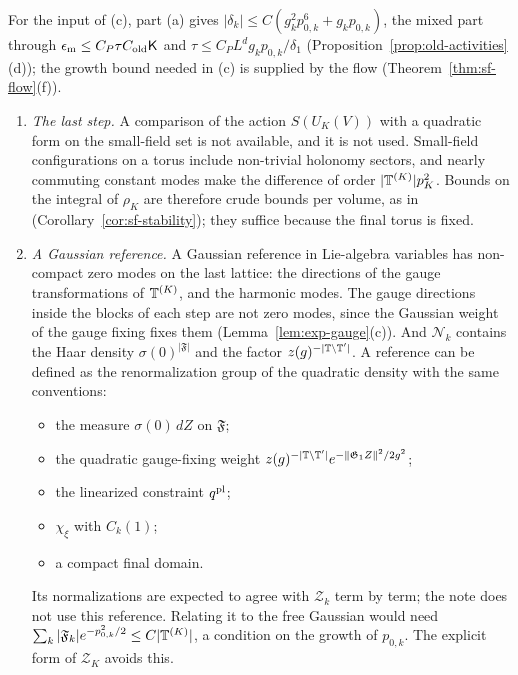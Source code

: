 For the input of (c), part (a) gives $|\delta_k|\le C(g_k^2p_{0,k}^6+g_kp_{0,k})$, the mixed part through $\epsilon_{\rm m}\le C_P\tau C_{\rm old}\mathsf K$ and $\tau\le C_PL^dg_kp_{0,k}/\delta_1$ (Proposition~\ref{prop:old-activities}(d)); the growth bound needed in (c) is supplied by the flow (Theorem~\ref{thm:sf-flow}(f)).

\begin{remark}\label{rem:sf-reference}
\begin{enumerate}[label=(\alph*)]
\item \emph{The last step.} A comparison of the action $S(U_K(V))$ with a quadratic form on the small-field set is not available, and it is not used. Small-field configurations on a torus include non-trivial holonomy sectors, and nearly commuting constant modes make the difference of order $|\mathbb T^{(K)}|p_K^2$. Bounds on the integral of $\rho_K$ are therefore crude bounds per volume, as in \cite{DimockI} (Corollary~\ref{cor:sf-stability}); they suffice because the final torus is fixed.
\item \emph{A Gaussian reference.} A Gaussian reference in Lie-algebra variables has non-compact zero modes on the last lattice: the directions of the gauge transformations of $\mathbb T^{(K)}$, and the harmonic modes. The gauge directions inside the blocks of each step are not zero modes, since the Gaussian weight of the gauge fixing fixes them (Lemma~\ref{lem:exp-gauge}(c)). And $\mathcal N_k$ contains the Haar density $\sigma(0)^{|\mathfrak F|}$ and the factor $z(g)^{-|\mathbb T\setminus\mathbb T'|}$. A reference can be defined as the renormalization group of the quadratic density with the same conventions:
  \begin{itemize}
  \item the measure $\sigma(0)\,dZ$ on $\mathfrak F$;
  \item the quadratic gauge-fixing weight $z(g)^{-|\mathbb T\setminus\mathbb T'|}e^{-\|\mathfrak G_1Z\|^2/2g^2}$;
  \item the linearized constraint $q^{\rm pl}$;
  \item $\chi_\xi$ with $C_k(1)$;
  \item a compact final domain.
  \end{itemize}
  Its normalizations are expected to agree with $\mathcal Z_k$ term by term; the note does not use this reference. Relating it to the free Gaussian would need $\sum_k|\mathfrak F_k|e^{-p_{0,k}^2/2}\le C|\mathbb T^{(K)}|$, a condition on the growth of $p_{0,k}$. The explicit form of $\mathcal Z_K$ avoids this.

\end{enumerate}
\end{remark}

